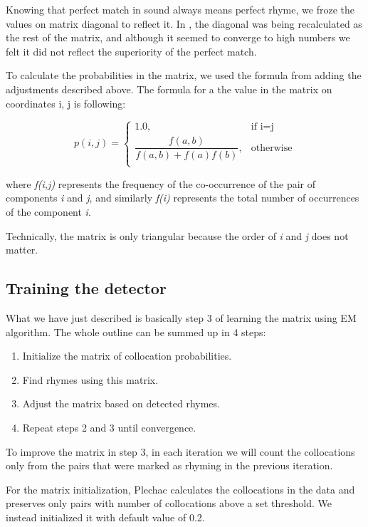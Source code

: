 Knowing that perfect match in sound always means perfect rhyme, we froze the values on matrix diagonal to reflect it. In \cite{plechavc2018collocation}, the diagonal was being recalculated as the rest of the matrix, and although it seemed to converge to high numbers we felt it did not reflect the superiority of the perfect match.

To calculate the probabilities in the matrix, we used the formula from \cite{plechavc2018collocation} adding the adjustments described above. The formula for a the value in the matrix on coordinates i, j is following: 


	    \[ p(i,j) = \begin{cases} 
	    \mbox{1.0,} & \mbox{if  i=j} \\ 
	   \dfrac{f(a,b)}{f(a,b) + f(a)f(b)},
	     & \mbox{otherwise} \\
	    \end{cases} \]

where\textit{ f(i,j)} represents the frequency of the co-occurrence of the pair of components \textit{i} and \textit{j}, and similarly \textit{f(i)} represents the total number of occurrences of the component \textit{i}.

Technically, the matrix is only triangular because the order of \textit{i} and \textit{j} does not matter.

\subsection{Training the detector}
What we have just described is basically step 3 of learning the matrix using EM algorithm. The whole outline can be summed up in 4 steps:
\begin{enumerate}
	\item Initialize the matrix of collocation probabilities.
	\item Find rhymes using this matrix.
	\item Adjust the matrix based on detected rhymes.
	\item Repeat steps 2 and 3 until convergence.
\end{enumerate} 

To improve the matrix in step 3, in each iteration we will count the collocations only from the pairs that were marked as rhyming in the previous iteration.

For the matrix initialization, Plechac calculates the collocations in the data and preserves only pairs with number of collocations above a set threshold. We instead initialized it with default value of 0.2. 

